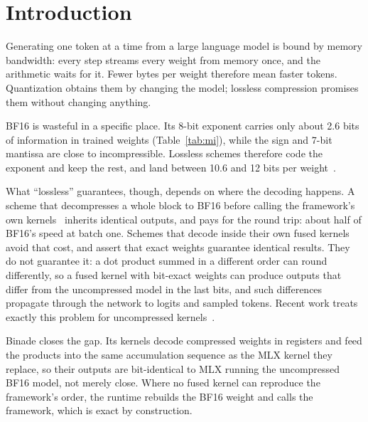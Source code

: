 \documentclass[11pt]{article}
\begin{document}
\section{Introduction}

Generating one token at a time from a large language model is bound by memory bandwidth: every step streams every weight from memory once, and the arithmetic waits for it. Fewer bytes per weight therefore mean faster tokens. Quantization obtains them by changing the model; lossless compression promises them without changing anything.

BF16 is wasteful in a specific place. Its 8-bit exponent carries only about 2.6 bits of information in trained weights (Table~\ref{tab:mi}), while the sign and 7-bit mantissa are close to incompressible. Lossless schemes therefore code the exponent and keep the rest, and land between 10.6 and 12 bits per weight~\citep{dfloat11,zipserv,unweight,enec,shannon}.

What ``lossless'' guarantees, though, depends on where the decoding happens. A scheme that decompresses a whole block to BF16 before calling the framework's own kernels~\citep{dfloat11} inherits identical outputs, and pays for the round trip: about half of BF16's speed at batch one. Schemes that decode inside their own fused kernels~\citep{zipserv,shannon,unweight} avoid that cost, and assert that exact weights guarantee identical results. They do not guarantee it: a dot product summed in a different order can round differently, so a fused kernel with bit-exact weights can produce outputs that differ from the uncompressed model in the last bits, and such differences propagate through the network to logits and sampled tokens. Recent work treats exactly this problem for uncompressed kernels~\citep{taming,thinkingmachines}.

Binade closes the gap. Its kernels decode compressed weights in registers and feed the products into the same accumulation sequence as the MLX kernel they replace, so their outputs are bit-identical to MLX running the uncompressed BF16 model, not merely close. Where no fused kernel can reproduce the framework's order, the runtime rebuilds the BF16 weight and calls the framework, which is exact by construction.
\end{document}

